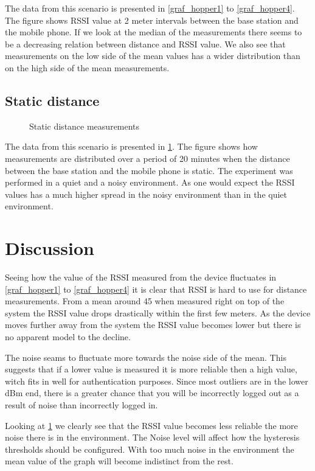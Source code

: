 %	
%	
%	
%	

The data from this scenario is presented in \cref{graf_hopper1} to \cref{graf_hopper4}.
The figure shows RSSI value at 2 meter intervals between the base station and the mobile phone.
If we look at the median of the measurements there seems to be a decreasing relation between distance and RSSI value.
We also see that measurements on the low side of the mean values has a wider distribution than on the high side of the mean measurements.

\subsection{Static distance}
\begin{figure}
	\centering
	
	
	\caption{Static distance measurements}
	\label{graf_StaticMesurements}
\end{figure}

The data from this scenario is presented in \cref{graf_StaticMesurements}.
The figure shows how measurements are distributed over a period of 20 minutes when the distance between the base station and the mobile phone is static.
The experiment was performed in a quiet and a noisy environment.
As one would expect the RSSI values has a much higher spread in the noisy environment than in the quiet environment. 
 

\section{Discussion}
Seeing how the value of the RSSI measured from the device fluctuates in \cref{graf_hopper1} to \cref{graf_hopper4} it is clear that RSSI is hard to use for distance measurements.
From a mean around 45 when measured right on top of the system the RSSI value drops drastically within the first few meters.
As the device moves further away from the system the RSSI value becomes lower but there is no apparent model to the decline.

The noise seams to fluctuate more towards the noise side of the mean. This suggests that if a lower value is measured it is more reliable then a high value, witch fits in well for authentication purposes.
Since most outliers are in the lower dBm end, there is a greater chance that you will be incorrectly logged out as a result of noise than incorrectly logged in.

Looking at \cref{graf_StaticMesurements} we clearly see that the RSSI value becomes less reliable the more noise there is in the environment.
The Noise level will affect how the hysteresis thresholds should be configured.
With too much noise in the environment the mean value of the graph will become indistinct from the rest.

